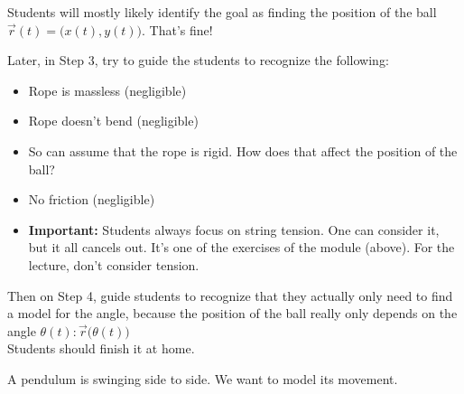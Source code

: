 \begin{annotation}
	\begin{goals}
		Students will mostly likely identify the goal as finding the position of the ball $\vec{r}(t) = \big( x(t) , y(t) \big)$. That's fine!
		
		Later, in Step 3, try to guide the students to recognize the following:
		\begin{itemize}
			\item Rope is massless (negligible)
			\item Rope doesn't bend (negligible)
			\item So can assume that the rope is rigid. How does that affect the position of the ball?
			\item No friction (negligible)
			\item \textbf{Important:} Students always focus on string tension. One can consider it, but it all cancels out. It's one of the exercises of the module (above). For the lecture, don't consider tension.
		\end{itemize}
		
		Then on Step 4, guide students to recognize that they actually only need to find a model for the angle, because the position of the ball really only depends on the angle $\theta(t): \vec{r}\big(\theta(t)\big)$ \\

		Students should finish it at home.				
	\end{goals}
\end{annotation}

\question \label{pendulum}
	A pendulum is swinging side to side. We want to model its movement.

